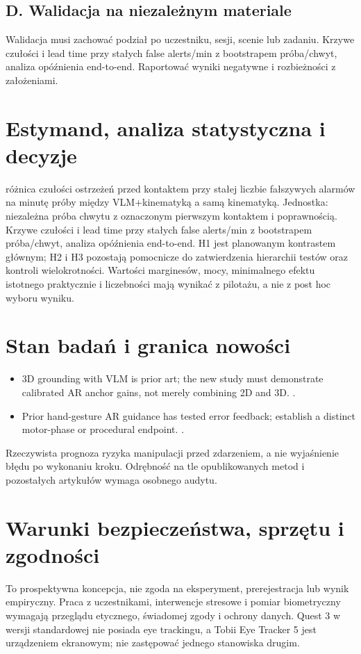 \documentclass[11pt,a4paper]{article}
\begin{document}
\subsection{D. Walidacja na niezależnym materiale}
Walidacja musi zachować podział po uczestniku, sesji, scenie lub zadaniu. Krzywe czułości i lead time przy stałych false alerts/min z bootstrapem próba/chwyt, analiza opóźnienia end-to-end. Raportować wyniki negatywne i rozbieżności z założeniami.
\section{Estymand, analiza statystyczna i decyzje}
różnica czułości ostrzeżeń przed kontaktem przy stałej liczbie fałszywych alarmów na minutę próby między VLM+kinematyką a samą kinematyką. Jednostka: niezależna próba chwytu z oznaczonym pierwszym kontaktem i poprawnością. Krzywe czułości i lead time przy stałych false alerts/min z bootstrapem próba/chwyt, analiza opóźnienia end-to-end. H1 jest planowanym kontrastem głównym; H2 i H3 pozostają pomocnicze do zatwierdzenia hierarchii testów oraz kontroli wielokrotności. Wartości marginesów, mocy, minimalnego efektu istotnego praktycznie i liczebności mają wynikać z pilotażu, a nie z post hoc wyboru wyniku.
\section{Stan badań i granica nowości}
\begin{itemize}
\item 3D grounding with VLM is prior art; the new study must demonstrate calibrated AR anchor gains, not merely combining 2D and 3D. \cite{xrprior1}.
\item Prior hand-gesture AR guidance has tested error feedback; establish a distinct motor-phase or procedural endpoint. \cite{xrprior2}.
\end{itemize}
Rzeczywista prognoza ryzyka manipulacji przed zdarzeniem, a nie wyjaśnienie błędu po wykonaniu kroku. Odrębność na tle opublikowanych metod i pozostałych artykułów wymaga osobnego audytu.
\section{Warunki bezpieczeństwa, sprzętu i zgodności}
To prospektywna koncepcja, nie zgoda na eksperyment, prerejestracja lub wynik empiryczny. Praca z uczestnikami, interwencje stresowe i pomiar biometryczny wymagają przeglądu etycznego, świadomej zgody i ochrony danych. Quest 3 w wersji standardowej nie posiada eye trackingu, a Tobii Eye Tracker 5 jest urządzeniem ekranowym; nie zastępować jednego stanowiska drugim.
\end{document}
